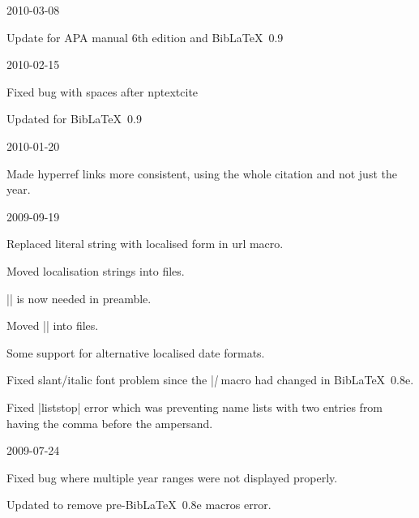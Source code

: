 \documentclass{ltxdockit}
\begin{document}
\begin{changelog}
\begin{release}{0.9}{2010-03-08}
\item Update for APA manual 6th edition and Bib\LaTeX\ 0.9
\end{release}

\begin{release}{0.8}{2010-02-15}
\item Fixed bug with spaces after nptextcite
\item Updated for Bib\LaTeX\ 0.9
\end{release}

\begin{release}{0.7}{2010-01-20}
\item Made hyperref links more consistent, using the whole citation and not
  just the year.
\end{release}


\begin{release}{0.5}{2009-09-19}
\item Replaced literal string with localised form in url macro.
\item Moved localisation strings into  files.
\item |\DeclareLanguageMapping| is now needed in preamble.
\item Moved |\DeclareBibliographyExtras| into  files.
\item Some support for alternative localised date formats.
\item Fixed slant/italic font problem since the |\mkbibemph| macro had
  changed in Bib\LaTeX\ 0.8e.
\item Fixed |liststop| error which was preventing name lists with two
  entries from having the comma before the ampersand.
\end{release}

\begin{release}{0.4}{2009-07-24}
\item Fixed bug where multiple year ranges were not displayed properly.
\item Updated to remove pre-Bib\LaTeX\ 0.8e macros error.
\end{release}


\end{changelog}
\end{document}
